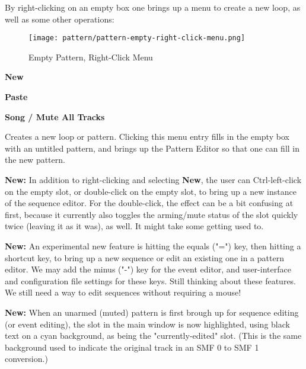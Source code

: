    By right-clicking on an empty box one brings up a menu to create
   a new loop, as well as some other operations:

\begin{figure}[H]
   \centering 
   \texttt{[image: pattern/pattern-empty-right-click-menu.png]}
   \caption{Empty Pattern, Right-Click Menu}
   \label{fig:pattern_window_empty_right_click}
\end{figure}

   \begin{enumber}
      \item \textbf{New}
      \item \textbf{Paste}
      \item \textbf{Song / Mute All Tracks}
   \end{enumber}

   \setcounter{ItemCounter}{0}      %

   Creates a new loop or pattern.
   Clicking this menu entry fills in the empty box with an untitled
   pattern, and brings up the Pattern Editor
   so that one can fill in the new pattern.

   \textbf{New:}
   In addition to right-clicking and selecting \textbf{New}, the user
   can Ctrl-left-click on the empty slot, or
   double-click on the empty slot, to bring up a new instance of the sequence
   editor.  For the double-click, the effect can be a bit confusing at first,
   because it currently also toggles the arming/mute status of the slot
   quickly twice (leaving it as it was), as well.  It might take some getting
   used to.

   \textbf{New:}
   An experimental new feature is hitting the equals ("=") key, then hitting
   a shortcut key, to bring up a new sequence or edit an existing one in a
   pattern editor.  We may add the minus ("-") key for the event editor, and
   user-interface and configuration file settings for these keys.
   Still thinking about these features.  We still need a way to edit sequences
   without requiring a mouse!

   \textbf{New:}
   When an unarmed (muted) pattern is first brough up for sequence editing (or
   event editing), the slot in the main window is now highlighted, using black
   text on a cyan background, as being the "currently-edited" slot.
   (This is the same background used to indicate the original track in an
   SMF 0 to SMF 1 conversion.)

